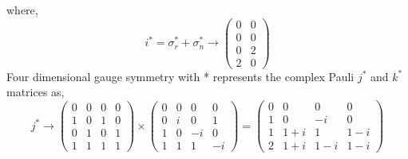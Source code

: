 \documentclass{article}
\begin{document}
where,\begin{equation}
    i^* = \sigma_r^* + \sigma_n^* \rightarrow
        \left(\begin{matrix}
0 & 0 \\
0 & 0 \\
0 & 2 \\
2 & 0
\end{matrix}\right)
\end{equation} Four dimensional gauge symmetry with * represents the complex Pauli $j^*$ and $k^*$ matrices as,
\begin{equation}
    j^* \rightarrow
    \left(\begin{matrix}
0 & 0 & 0 & 0 \\
1 & 0 & 1 & 0 \\
0 & 1 & 0 & 1 \\
1 & 1 & 1 & 1
\end{matrix}\right) \times
\left(\begin{matrix}
0 & 0 & 0 & 0 \\
0 & i & 0 & 1 \\
1 & 0 & -i & 0 \\
1 & 1 & 1 & -i
\end{matrix}\right) =
\left(\begin{matrix}
0 & 0 & 0 & 0 \\
1 & 0 & -i & 0 \\
1 & 1+i & 1 & 1-i \\
2 & 1+i & 1-i & 1-i
\end{matrix}\right)
\end{equation}
\end{document}
